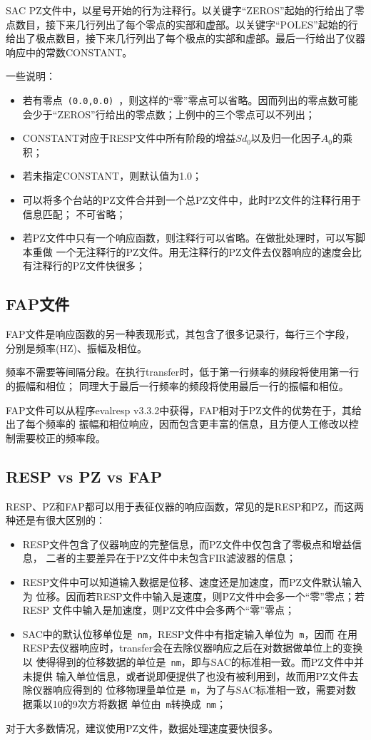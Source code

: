 SAC PZ文件中，以星号开始的行为注释行。以关键字``ZEROS''起始的行给出了零点数目，接下来几行列出了每个零点的实部和虚部。以关键字``POLES''起始的行给出了极点数目，接下来几行列出了每个极点的实部和虚部。最后一行给出了仪器响应中的常数CONSTANT。

一些说明：
\begin{itemize}
\item 若有零点~\verb+(0.0,0.0)+~，则这样的``零''零点可以省略。因而列出的零点数可能会少于``ZEROS''行给出的零点数；上例中的三个零点可以不列出；
\item CONSTANT对应于RESP文件中所有阶段的增益$Sd_0$以及归一化因子$A_0$的乘积；
\item 若未指定CONSTANT，则默认值为1.0；
\item 可以将多个台站的PZ文件合并到一个总PZ文件中，此时PZ文件的注释行用于信息匹配；
    不可省略；
\item 若PZ文件中只有一个响应函数，则注释行可以省略。在做批处理时，可以写脚本重做
    一个无注释行的PZ文件。用无注释行的PZ文件去仪器响应的速度会比有注释行的PZ文件快很多；
\end{itemize}

\subsection{FAP文件}
FAP文件是响应函数的另一种表现形式，其包含了很多记录行，每行三个字段，
分别是频率(HZ)、振幅及相位。

频率不需要等间隔分段。在执行transfer时，低于第一行频率的频段将使用第一行的振幅和相位；
同理大于最后一行频率的频段将使用最后一行的振幅和相位。

FAP文件可以从程序evalresp v3.3.2中获得，FAP相对于PZ文件的优势在于，其给出了每个频率的
振幅和相位响应，因而包含更丰富的信息，且方便人工修改以控制需要校正的频率段。

\subsection{RESP vs PZ vs FAP}
RESP、PZ和FAP都可以用于表征仪器的响应函数，常见的是RESP和PZ，而这两种还是有很大区别的：

\begin{itemize}
\item RESP文件包含了仪器响应的完整信息，而PZ文件中仅包含了零极点和增益信息，
    二者的主要差异在于PZ文件中未包含FIR滤波器的信息；
\item RESP文件中可以知道输入数据是位移、速度还是加速度，而PZ文件默认输入为
    位移。因而若RESP文件中输入是速度，则PZ文件中会多一个``零''零点；若RESP
    文件中输入是加速度，则PZ文件中会多两个``零''零点；
\item SAC中的默认位移单位是~\verb+nm+，RESP文件中有指定输入单位为~\verb+m+，因而
    在用RESP去仪器响应时，transfer会在去除仪器响应之后在对数据做单位上的变换以
    使得得到的位移数据的单位是~\verb+nm+，即与SAC的标准相一致。而PZ文件中并未提供
    输入单位信息，或者说即便提供了也没有被利用到，故而用PZ文件去除仪器响应得到的
    位移物理量单位是~\verb+m+，为了与SAC标准相一致，需要对数据乘以10的9次方将数据
    单位由~\verb+m+转换成~\verb+nm+；
\end{itemize}

对于大多数情况，建议使用PZ文件，数据处理速度要快很多。
